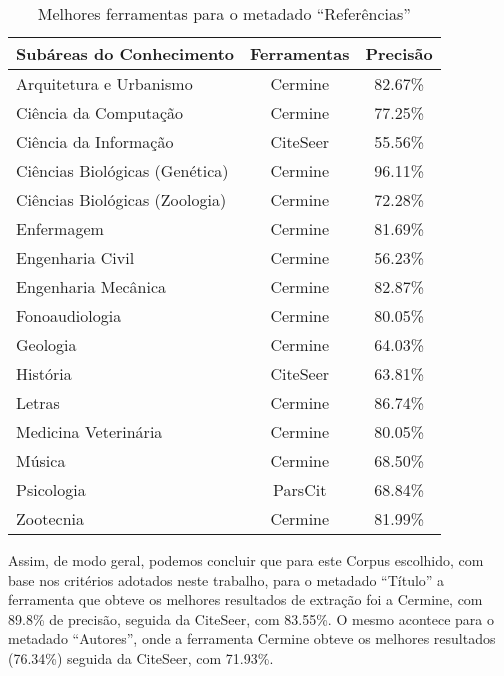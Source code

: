 \begin{table}
    \caption{Melhores ferramentas para o metadado ``Referências''}
    \begin{center}
        \begin{tabular}{|l|c|c|}
            \hline 
            \textbf{Subáreas do Conhecimento} & \textbf{Ferramentas} & \textbf{Precisão} \\ 
            \hline 
            Arquitetura e Urbanismo & Cermine & 82.67\% \\ \hline
            Ciência da Computação & Cermine & 77.25\% \\ \hline
            Ciência da Informação & CiteSeer & 55.56\% \\ \hline
            Ciências Biológicas (Genética) & Cermine & 96.11\% \\ \hline
            Ciências Biológicas (Zoologia) & Cermine & 72.28\% \\ \hline
            Enfermagem & Cermine & 81.69\% \\ \hline
            Engenharia Civil & Cermine & 56.23\% \\ \hline
            Engenharia Mecânica & Cermine & 82.87\% \\ \hline
            Fonoaudiologia & Cermine & 80.05\% \\ \hline
            Geologia & Cermine & 64.03\% \\ \hline
            História & CiteSeer & 63.81\% \\ \hline
            Letras & Cermine & 86.74\% \\ \hline
            Medicina Veterinária & Cermine & 80.05\% \\ \hline
            Música & Cermine & 68.50\% \\ \hline
            Psicologia & ParsCit & 68.84\% \\ \hline
            Zootecnia & Cermine & 81.99\% \\ \hline
        \end{tabular}
    \end{center}
    \label{tab:areas-references-tools}
\end{table}

Assim, de modo geral, podemos concluir que para este Corpus escolhido, com base nos critérios adotados neste trabalho, para o metadado ``Título'' a ferramenta que obteve os melhores resultados de extração foi a Cermine, com 89.8\% de precisão, seguida da CiteSeer, com 83.55\%. O mesmo acontece para o metadado ``Autores'', onde a ferramenta Cermine obteve os melhores resultados (76.34\%) seguida da CiteSeer, com 71.93\%.

